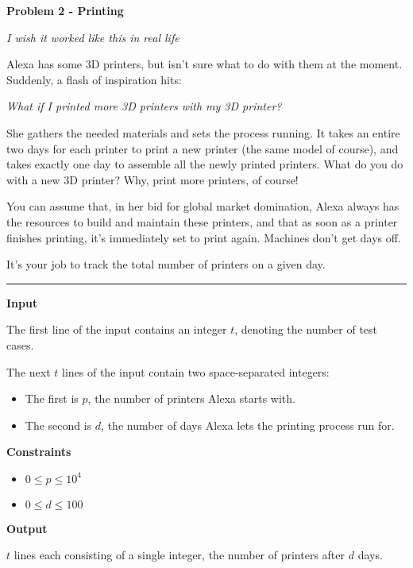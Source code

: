 \LARGE \textbf{Problem 2 - Printing} \normalsize

{\itshape I wish it worked like this in real life}

Alexa has some 3D printers, but isn't sure what to do with them at the moment.
Suddenly, a flash of inspiration hits:

\begin{center}
    \textit{What if I printed more 3D printers with my 3D printer?}
\end{center}

She gathers the needed materials and sets the process running. 
It takes an entire two days for each printer to print a new printer (the same model of course), 
and takes exactly one day to assemble all the newly printed printers.
What do you do with a new 3D printer? Why, print more printers, of course!

You can assume that, in her bid for global market domination, 
Alexa always has the resources to build and maintain these printers, 
and that as soon as a printer finishes printing, it's immediately set to print again. 
Machines don't get days off.

It's your job to track the total number of printers on a given day.

\vspace{8pt}
\hrule

\textbf{Input}

The first line of the input contains an integer $t$, denoting the number of test cases.

The next $t$ lines of the input contain two space-separated integers:
\begin{itemize}
    \item The first is $p$, the number of printers Alexa starts with.
    \item The second is $d$, the number of days Alexa lets the printing process run for.
\end{itemize}

\textbf{Constraints}

\begin{itemize}
    \item $0 \leq p \leq 10^4$
    \item $0 \leq d \leq 100$
\end{itemize}

\textbf{Output}

$t$ lines each consisting of a single integer, the number of printers after $d$ days.

